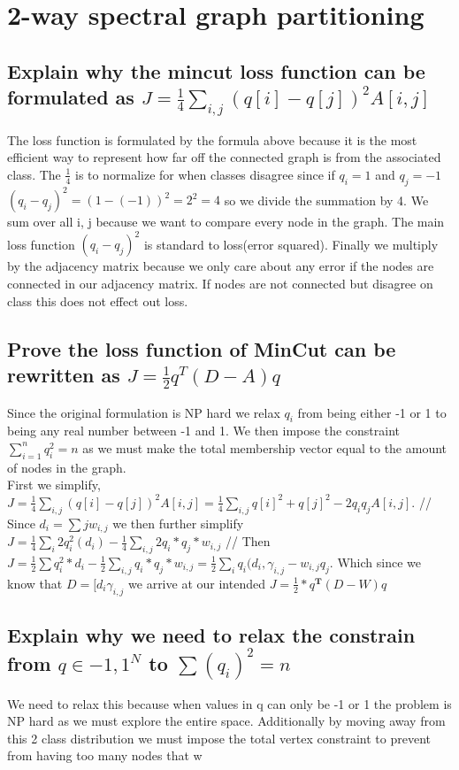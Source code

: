 \documentclass[11pt]{article}
\begin{document}
\section{2-way spectral graph partitioning}
\subsection{Explain why the mincut loss function can be formulated as $J = \frac{1}{4}\sum_{i,j} (q[i] - q[j])^2 A[i,j]$}
The loss function is formulated by the formula above because it is the most efficient way to represent how far off the connected graph is from the associated class. The $\frac{1}{4}$ is to normalize for when classes disagree since if $q_i = 1$ and $q_j=-1$ $(q_i-q_j)^2 = (1-(-1))^2= 2^2 = 4$ so we divide the summation by 4. We sum over all i, j because we want to compare every node in the graph. The main loss function $(q_i - q_j)^2$ is standard to loss(error squared). Finally we multiply by the adjacency matrix because we only care about any error if the nodes are connected in our adjacency matrix. If nodes are not connected but disagree on class this does not effect out loss. 
\subsection{Prove the loss function of MinCut can be rewritten as $J= \frac{1}{2}q^T(D-A)q$}
Since the original formulation is NP hard we relax $q_i$ from being either -1 or 1 to being any real number between -1 and 1. We then impose the constraint $\sum_{i=1}^n q_i^2= n$ as we must make the total membership vector equal to the amount of nodes in the graph.\\
First we simplify, $J = \frac{1}{4}\sum_{i,j} (q[i] - q[j])^2 A[i,j] = \frac{1}{4}\sum_{i,j} q[i]^2 + q[j]^2 - 2q_i q_j A[i,j]$. // 
Since $d_i = \sum{j}w_{i,j}$ we then further simplify $J = \frac{1}{4}\sum_i 2q_i^2 (d_i) - \frac{1}{4} \sum_{i,j}2q_i*q_j*w_{i,j}$ //
Then $J=\frac{1}{2}\sum q_i^2*d_i - \frac{1}{2}\sum_{i,j}q_i * q_j* w_{i,j} = \frac{1}{2} \sum_i q_i(d_i, \gamma_{i,j}  - w_{i,j}q_j$. Which since we know that $D= [d_i \gamma_{i,j}$ we arrive at our intended $J= \frac{1}{2} *q^\textbf{T}(D-W)q$
\subsection{Explain why we need to relax the constrain from $q \in {-1, 1}^N$ to $\sum (q_i)^2 = n$}
We need to relax this because when values in q can only be -1 or 1 the problem is NP hard as we must explore the entire space. Additionally by moving away from this 2 class distribution we must impose the total vertex constraint to prevent from having too many nodes that w
\end{document}
